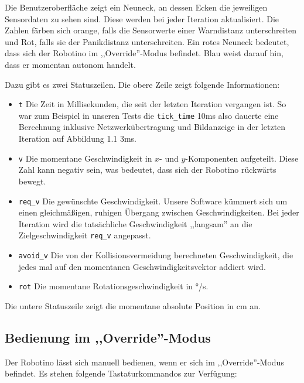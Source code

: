 
Die Benutzeroberfläche zeigt ein Neuneck, an dessen Ecken die jeweiligen
Sensordaten zu sehen sind. Diese werden bei jeder Iteration aktualisiert. Die
Zahlen färben sich orange, falls die Sensorwerte einer Warndistanz
unterschreiten und Rot, falls sie der Panikdistanz unterschreiten. Ein rotes
Neuneck bedeutet, dass sich der Robotino im ,,Override''-Modus befindet. Blau
weist darauf hin, dass er momentan autonom handelt.

Dazu gibt es zwei Statuszeilen. Die obere Zeile zeigt folgende Informationen:

\begin{itemize}
	\item \verb|t|
		Die Zeit in Millisekunden, die seit der letzten Iteration vergangen ist.
		So war zum Beispiel in unseren Tests die \verb|tick_time| 10ms also
		dauerte eine Berechnung inklusive Netzwerkübertragung und Bildanzeige in
		der letzten Iteration auf Abbildung 1.1 3ms.

	\item \verb|v|
		Die momentane Geschwindigkeit in $x$- und $y$-Komponenten aufgeteilt.
		Diese Zahl kann negativ sein, was bedeutet, dass sich der Robotino
		rückwärts bewegt.

	\item \verb|req_v|
		Die gewünschte Geschwindigkeit. Unsere Software kümmert sich um einen
		gleichmäßigen, ruhigen Übergang zwischen Geschwindigkeiten. Bei jeder
		Iteration wird die tatsächliche Geschwindigkeit ,,langsam'' an die
		Zielgeschwindigkeit \verb|req_v| angepasst.

	\item \verb|avoid_v|
		Die von der Kollisionsvermeidung berechneten Geschwindigkeit, die jedes
		mal auf den momentanen Geschwindigkeitsvektor addiert wird.

	\item \verb|rot|
		Die momentane Rotationsgeschwindigkeit in °/s.
\end{itemize}

Die untere Statuszeile zeigt die momentane absolute Position in cm an.


\subsection{Bedienung im ,,Override''-Modus}

Der Robotino lässt sich manuell bedienen, wenn er sich im ,,Override''-Modus
befindet. Es stehen folgende Tastaturkommandos zur Verfügung:

